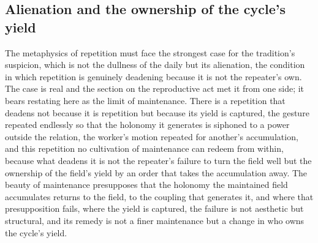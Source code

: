 \subsection{Alienation and the ownership of the cycle's yield}
\label{p22:sub:maintenance-alienation}

The metaphysics of repetition must face the strongest case for the tradition's suspicion, which is not the dullness of the daily but its alienation, the condition in which repetition is genuinely deadening because it is not the repeater's own. The case is real and the section on the reproductive act met it from one side; it bears restating here as the limit of maintenance. There is a repetition that deadens not because it is repetition but because its yield is captured, the gesture repeated endlessly so that the holonomy it generates is siphoned to a power outside the relation, the worker's motion repeated for another's accumulation, and this repetition no cultivation of maintenance can redeem from within, because what deadens it is not the repeater's failure to turn the field well but the ownership of the field's yield by an order that takes the accumulation away. The beauty of maintenance presupposes that the holonomy the maintained field accumulates returns to the field, to the coupling that generates it, and where that presupposition fails, where the yield is captured, the failure is not aesthetic but structural, and its remedy is not a finer maintenance but a change in who owns the cycle's yield.


